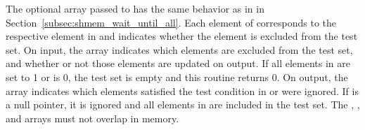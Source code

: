 \begin{apidefinition}
{    The optional  array passed to  has the
    same behavior as in  in
    Section~\ref{subsec:shmem_wait_until_all}.   Each element of 
    corresponds to the respective element in  and indicates whether
    the element is excluded from the test set.  On input, the 
    array indicates which elements are excluded from the test set, and whether
    or not those elements are updated on output.  If all
    elements in  are set to 1 or  is 0, the test set is
    empty and this routine returns 0.  On output, the  array
    indicates which elements satisfied the test condition in  or
    were ignored.  If  is a null pointer, it is ignored and all
    elements in  are included in the test set.  The ,
    , and  arrays must not overlap in memory.
}



\end{apidefinition}
